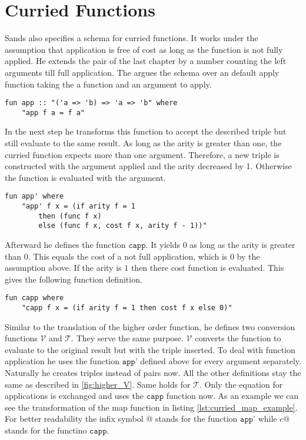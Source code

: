 
\section{Curried Functions}

Sands also specifies a schema for curried functions.
It works under the assumption that application is free of cost as long as the function is not fully applied.
He extends the pair of the last chapter by a number counting the left arguments till full application.
The argues the schema over an default apply function taking the a function and an argument to apply.
\begin{lstlisting}[language=isabelle,mathescape=true]
  fun app :: "('a => 'b) => 'a => 'b" where
    "app f a = f a"
\end{lstlisting}

In the next step he transforms this function to accept the described triple but still evaluate to the same result.
As long as the arity is greater than one, the curried function expects more than one argument.
Therefore, a new triple is constructed with the argument applied and the arity decreased by 1.
Otherwise the function is evaluated with the argument.
\begin{lstlisting}[language=isabelle,mathescape=true]
  fun app' where
    "app' f x = (if arity f = 1
        then (func f x)
        else (func f x, cost f x, arity f - 1))"
\end{lstlisting}

Afterward he defines the function $\texttt{capp}$.
It yields $0$ as long as the arity is greater than $0$.
This equals the cost of a not full application, which is $0$ by the assumption above.
If the arity is $1$ then there cost function is evaluated.
This gives the following function definition.
\begin{lstlisting}[language=isabelle,mathescape=true]
  fun capp where
    "capp f x = (if arity f = 1 then cost f x else 0)"
\end{lstlisting}

Similar to the translation of the higher order function, he defines two conversion functions $\mathcal{V}$ and $\mathcal{T}$.
They serve the same purpose.
$\mathcal{V}$ converts the function to evaluate to the original result but with the triple inserted.
To deal with function application he uses the function $\texttt{app'}$ defined above for every argument separately.
Naturally he creates triples instead of pairs now.
All the other definitions stay the same as described in \ref{fig:higher_V}.
Same holds for $\mathcal{T}$.
Only the equation for applications is exchanged and uses the $\texttt{capp}$ function now.
As an example we can see the transformation of the map function in listing \ref{lst:curried_map_example}.
For better readability the infix symbol $@$ stands for the function $\texttt{app'}$ while $c@$ stands for the functino $\texttt{capp}$.

